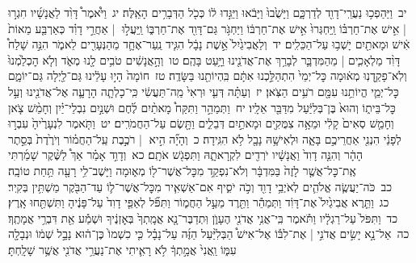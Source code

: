 \documentclass[18pt]{article}
\newcommand{\kri}[1]{\Afootnote{#1}}	%
\begin{document}
 {\loc יב~}וַיַּהַפְכ֥וּ נַעֲרֵֽי־דָוִ֖ד לְדַרְכָּ֑ם וַיָּשֻׁ֙בוּ֙ וַיָּבֹ֔אוּ וַיַּגִּ֣דוּ ל֔וֹ כְּכֹ֖ל הַדְּבָרִ֥ים הָאֵֽלֶּה׃ \startlock
 {\loc יג~}וַיֹּ֩אמֶר֩ דָּוִ֨ד לַאֲנָשָׁ֜יו חִגְר֣וּ  |  אִ֣ישׁ אֶת־חַרְבּ֗וֹ וַֽיַּחְגְּרוּ֙ אִ֣ישׁ אֶת־חַרְבּ֔וֹ וַיַּחְגֹּ֥ר גַּם־דָּוִ֖ד אֶת־חַרְבּ֑וֹ וַֽיַּעֲל֣וּ  |  אַחֲרֵ֣י דָוִ֗ד כְּאַרְבַּ֤ע מֵאוֹת֙ אִ֔ישׁ וּמָאתַ֖יִם יָשְׁב֥וּ עַל־הַכֵּלִֽים׃ \startlock
 {\loc יד~}וְלַאֲבִיגַ֙יִל֙ אֵ֣שֶׁת נָבָ֔ל הִגִּ֧יד נַֽעַר־אֶחָ֛ד מֵהַנְּעָרִ֖ים לֵאמֹ֑ר הִנֵּ֣ה שָׁלַח֩ דָּוִ֨ד מַלְאָכִ֧ים  |  מֵהַמִּדְבָּ֛ר לְבָרֵ֥ךְ אֶת־אֲדֹנֵ֖ינוּ וַיָּ֥עַט בָּהֶֽם׃ \startlock
 {\loc טו~}וְהָ֣אֲנָשִׁ֔ים טֹבִ֥ים לָ֖נוּ מְאֹ֑ד וְלֹ֤א הׇכְלַ֙מְנוּ֙ וְלֹֽא־פָקַ֣דְנֽוּ מְא֔וּמָה כׇּל־יְמֵי֙ הִתְהַלַּ֣כְנוּ אִתָּ֔ם בִּֽהְיוֹתֵ֖נוּ בַּשָּׂדֶֽה׃ \startlock
 {\loc טז~}חוֹמָה֙ הָי֣וּ עָלֵ֔ינוּ גַּם־לַ֖יְלָה גַּם־יוֹמָ֑ם כׇּל־יְמֵ֛י הֱיוֹתֵ֥נוּ עִמָּ֖ם רֹעִ֥ים הַצֹּֽאן׃ \startlock
 {\loc יז~}וְעַתָּ֗ה דְּעִ֤י וּרְאִי֙ מַֽה־תַּעֲשִׂ֔י כִּֽי־כָלְתָ֧ה הָרָעָ֛ה אֶל־אֲדֹנֵ֖ינוּ וְעַ֣ל כׇּל־בֵּית֑וֹ וְהוּא֙ בֶּן־בְּלִיַּ֔עַל מִדַּבֵּ֖ר אֵלָֽיו׃ \startlock
 {\loc יח~}וַתְּמַהֵ֣ר  \edtext{(אבוגיל)}{\kri{קרי: אֲבִיגַ֡יִל}}  וַתִּקַּח֩ מָאתַ֨יִם לֶ֜חֶם וּשְׁנַ֣יִם נִבְלֵי־יַ֗יִן וְחָמֵ֨שׁ צֹ֤אן  \edtext{(עשוות)}{\kri{קרי: עֲשׂוּיוֹת֙}}  וְחָמֵ֤שׁ סְאִים֙ קָלִ֔י וּמֵאָ֥ה צִמֻּקִ֖ים וּמָאתַ֣יִם דְּבֵלִ֑ים וַתָּ֖שֶׂם עַל־הַחֲמֹרִֽים׃ \startlock
 {\loc יט~}וַתֹּ֤אמֶר לִנְעָרֶ֙יהָ֙ עִבְר֣וּ לְפָנַ֔י הִנְנִ֖י אַחֲרֵיכֶ֣ם בָּאָ֑ה וּלְאִישָׁ֥הּ נָבָ֖ל לֹ֥א הִגִּֽידָה׃ \startlock
 {\loc כ~}וְהָיָ֞ה הִ֣יא  |  רֹכֶ֣בֶת עַֽל־הַחֲמ֗וֹר וְיֹרֶ֙דֶת֙ בְּסֵ֣תֶר הָהָ֔ר וְהִנֵּ֤ה דָוִד֙ וַאֲנָשָׁ֔יו יֹרְדִ֖ים לִקְרָאתָ֑הּ וַתִּפְגֹ֖שׁ אֹתָֽם׃ \startlock
 {\loc כא~}וְדָוִ֣ד אָמַ֗ר אַךְ֩ לַשֶּׁ֨קֶר שָׁמַ֜רְתִּי אֶֽת־כׇּל־אֲשֶׁ֤ר לָזֶה֙ בַּמִּדְבָּ֔ר וְלֹא־נִפְקַ֥ד מִכׇּל־אֲשֶׁר־ל֖וֹ מְא֑וּמָה וַיָּשֶׁב־לִ֥י רָעָ֖ה תַּ֥חַת טוֹבָֽה׃ \startlock
 {\loc כב~}כֹּה־יַעֲשֶׂ֧ה אֱלֹהִ֛ים לְאֹיְבֵ֥י דָוִ֖ד וְכֹ֣ה יֹסִ֑יף אִם־אַשְׁאִ֧יר מִכׇּל־אֲשֶׁר־ל֛וֹ עַד־הַבֹּ֖קֶר מַשְׁתִּ֥ין בְּקִֽיר׃ \startlock
 {\loc כג~}וַתֵּ֤רֶא אֲבִיגַ֙יִל֙ אֶת־דָּוִ֔ד וַתְּמַהֵ֕ר וַתֵּ֖רֶד מֵעַ֣ל הַחֲמ֑וֹר וַתִּפֹּ֞ל לְאַפֵּ֤י דָוִד֙ עַל־פָּנֶ֔יהָ וַתִּשְׁתַּ֖חוּ אָֽרֶץ׃ \startlock
 {\loc כד~}וַתִּפֹּל֙ עַל־רַגְלָ֔יו וַתֹּ֕אמֶר בִּֽי־אֲנִ֥י אֲדֹנִ֖י הֶעָוֺ֑ן וּֽתְדַבֶּר־נָ֤א אֲמָֽתְךָ֙ בְּאׇזְנֶ֔יךָ וּשְׁמַ֕ע אֵ֖ת דִּבְרֵ֥י אֲמָתֶֽךָ׃ \startlock
 {\loc כה~}אַל־נָ֣א יָשִׂ֣ים אֲדֹנִ֣י  |  אֶת־לִבּ֡וֹ אֶל־אִישׁ֩ הַבְּלִיַּ֨עַל הַזֶּ֜ה עַל־נָבָ֗ל כִּ֤י כִשְׁמוֹ֙ כֶּן־ה֔וּא נָבָ֣ל שְׁמ֔וֹ וּנְבָלָ֖ה עִמּ֑וֹ וַֽאֲנִי֙ אֲמָ֣תְךָ֔ לֹ֥א רָאִ֛יתִי אֶת־נַעֲרֵ֥י אֲדֹנִ֖י אֲשֶׁ֥ר שָׁלָֽחְתָּ׃ \startlock
\end{document}
